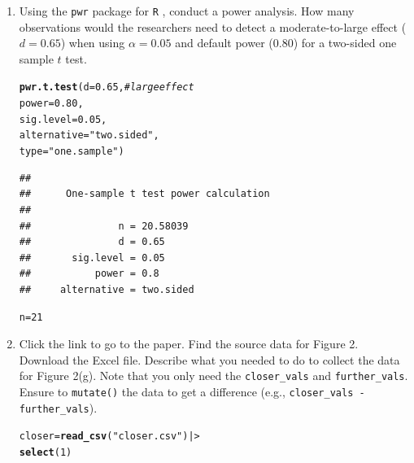 \documentclass{article}\usepackage[]{graphicx}\usepackage[]{xcolor}
\makeatletter
\newcommand{\hlnum}[1]{\textcolor[rgb]{0.686,0.059,0.569}{#1}}%
\newcommand{\hlsng}[1]{\textcolor[rgb]{0.192,0.494,0.8}{#1}}%
\newcommand{\hlcom}[1]{\textcolor[rgb]{0.678,0.584,0.686}{\textit{#1}}}%
\newcommand{\hldef}[1]{\textcolor[rgb]{0.345,0.345,0.345}{#1}}%
\newcommand{\hlkwb}[1]{\textcolor[rgb]{0.69,0.353,0.396}{#1}}%
\newcommand{\hlkwc}[1]{\textcolor[rgb]{0.333,0.667,0.333}{#1}}%
\newcommand{\hlkwd}[1]{\textcolor[rgb]{0.737,0.353,0.396}{\textbf{#1}}}%
\newenvironment{kframe}{%
 \def\at@end@of@kframe{}%
 \ifinner\ifhmode%
  \def\at@end@of@kframe{\end{minipage}}%
  \begin{minipage}{\columnwidth}%
 \fi\fi%
 \def\FrameCommand##1{\hskip\@totalleftmargin \hskip-\fboxsep
 \colorbox{shadecolor}{##1}\hskip-\fboxsep
     \hskip-\linewidth \hskip-\@totalleftmargin \hskip\columnwidth}%
 \MakeFramed {\advance\hsize-\width
   \@totalleftmargin\z@ \linewidth\hsize
   \@setminipage}}%
 {\par\unskip\endMakeFramed%
 \at@end@of@kframe}
\newenvironment{knitrout}{}{} %
\makeatother
\begin{document}
\begin{enumerate}
\item Using the \texttt{pwr} package for \texttt{R} \citep{pwr},
conduct a power analysis. How many observations would the researchers 
need to detect a moderate-to-large effect ($d=0.65$) when using 
$\alpha=0.05$ and default power (0.80) for a two-sided one sample 
$t$ test.
\begin{knitrout}\scriptsize
{}\color{fgcolor}\begin{kframe}
\begin{alltt}
\hlkwd{pwr.t.test}\hldef{(}\hlkwc{d} \hldef{=} \hlnum{0.65}\hldef{,} \hlcom{# large effect}
           \hlkwc{power} \hldef{=} \hlnum{0.80}\hldef{,}
           \hlkwc{sig.level} \hldef{=} \hlnum{0.05}\hldef{,}
           \hlkwc{alternative} \hldef{=} \hlsng{"two.sided"}\hldef{,}
           \hlkwc{type} \hldef{=} \hlsng{"one.sample"}\hldef{)}
\end{alltt}
\begin{verbatim}
## 
##      One-sample t test power calculation 
## 
##               n = 20.58039
##               d = 0.65
##       sig.level = 0.05
##           power = 0.8
##     alternative = two.sided
\end{verbatim}
\begin{alltt}
\hldef{n} \hlkwb{=} \hlnum{21}
\end{alltt}
\end{kframe}
\end{knitrout}
\item Click the link to go to the paper. Find the source data for 
Figure 2. Download the Excel file. Describe what you needed to
do to collect the data for Figure 2(g). Note that you only need the 
\texttt{closer\_vals} and \texttt{further\_vals}. Ensure to 
\texttt{mutate()} the data to get a difference 
(e.g., \texttt{closer\_vals - further\_vals}).
\begin{knitrout}\scriptsize
{}\color{fgcolor}\begin{kframe}
\begin{alltt}
\hldef{closer} \hlkwb{=} \hlkwd{read_csv}\hldef{(}\hlsng{"closer.csv"}\hldef{) |>}
  \hlkwd{select}\hldef{(}\hlnum{1}\hldef{)}
\end{alltt}



\end{kframe}
\end{knitrout}
\end{enumerate}
\end{document}
